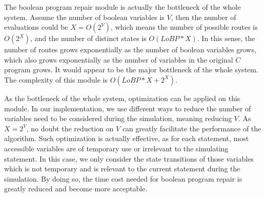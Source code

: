 The boolean program repair module is actually the bottleneck of the whole system.
Assume the number of boolean variables is $V$, then the number of evaluations could be $X = O(2^{V})$, which means the number of possible routes is $O(2^{X})$,
and the number of distinct states is $O(LoBP * X)$.
In this sense, the number of routes grows exponentially as the number of boolean variables grows, which also grows exponentially as the number of variables in the original $C$ program grows. It would appear to be the major bottleneck of the whole system. The complexity of this module is $O(LoBP * X + 2^{X})$.

As the bottleneck of the whole system, optimization can be applied on this module.
In our implementation, we use different ways to reduce the number of variables need to be considered during the simulation, meaning reducing $V$.
As $X = 2^{V}$, no doubt the reduction on $V$ can greatly facilitate the performance of the algorithm.
Such optimization is actually effective, as for each statement, most accessible variables are of temporary use or irrelevant to the simulating statement.
In this case, we only consider the state transitions of those variables which is not temporary and is relevant to the current statement during the simulation.
By doing so, the time cost needed for boolean program repair is greatly reduced and become more acceptable.

